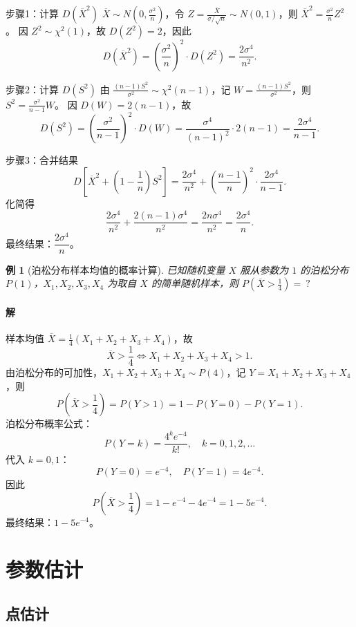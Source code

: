 \documentclass[11pt,a4paper,oneside,openany]{book}
\theoremstyle{yhbthm}
\newtheorem{example}{例}[section]
\begin{document}
步骤1：计算 $D(\overline{X}^2)$
$\overline{X} \sim N\left(0, \frac{\sigma^2}{n}\right)$，令 $Z = \frac{\overline{X}}{\sigma/\sqrt{n}} \sim N(0,1)$，则 $\overline{X}^2 = \frac{\sigma^2}{n} Z^2$。
因 $Z^2 \sim \chi^2(1)$，故 $D(Z^2) = 2$，因此
\[
D(\overline{X}^2) = \left(\frac{\sigma^2}{n}\right)^2 \cdot D(Z^2) = \frac{2\sigma^4}{n^2}.
\]

步骤2：计算 $D(S^2)$
由 $\frac{(n-1)S^2}{\sigma^2} \sim \chi^2(n-1)$，记 $W = \frac{(n-1)S^2}{\sigma^2}$，则 $S^2 = \frac{\sigma^2}{n-1} W$。
因 $D(W) = 2(n-1)$，故
\[
D(S^2) = \left(\frac{\sigma^2}{n-1}\right)^2 \cdot D(W) = \frac{\sigma^4}{(n-1)^2} \cdot 2(n-1) = \frac{2\sigma^4}{n-1}.
\]

步骤3：合并结果
\[
D\left[\overline{X}^2 + \left(1 - \frac{1}{n}\right)S^2\right] = \frac{2\sigma^4}{n^2} + \left(\frac{n-1}{n}\right)^2 \cdot \frac{2\sigma^4}{n-1}.
\]
化简得
\[
\frac{2\sigma^4}{n^2} + \frac{2(n-1)\sigma^4}{n^2} = \frac{2n\sigma^4}{n^2} = \frac{2\sigma^4}{n}.
\]
最终结果：$\boxed{\dfrac{2\sigma^4}{n}}$。

\begin{example}[泊松分布样本均值的概率计算]
已知随机变量 $X$ 服从参数为 $1$ 的泊松分布 $P(1)$，$X_1,X_2,X_3,X_4$ 为取自 $X$ 的简单随机样本，则 $P\left(\overline{X} > \frac{1}{4}\right) = \ ?$
\end{example}

\subsubsection{解}
样本均值 $\overline{X} = \frac{1}{4}(X_1+X_2+X_3+X_4)$，故
\[
\overline{X} > \frac{1}{4} \iff X_1+X_2+X_3+X_4 > 1.
\]
由泊松分布的可加性，$X_1+X_2+X_3+X_4 \sim P(4)$，记 $Y = X_1+X_2+X_3+X_4$，则
\[
P\left(\overline{X} > \frac{1}{4}\right) = P(Y > 1) = 1 - P(Y=0) - P(Y=1).
\]
泊松分布概率公式：
\[
P(Y=k) = \frac{4^k e^{-4}}{k!}, \quad k=0,1,2,\dots
\]
代入 $k=0,1$：
\[
P(Y=0) = e^{-4}, \quad P(Y=1) = 4e^{-4}.
\]
因此
\[
P\left(\overline{X} > \frac{1}{4}\right) = 1 - e^{-4} - 4e^{-4} = 1 - 5e^{-4}.
\]
最终结果：$\boxed{1 - 5e^{-4}}$。

\chapter{参数估计}
\section{点估计}
\end{document}
